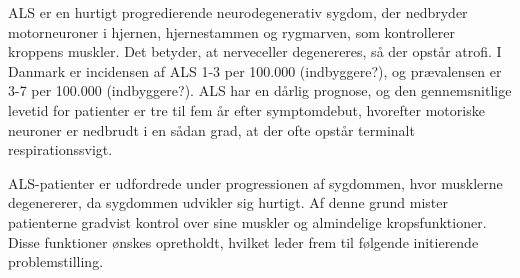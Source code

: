 ALS er en hurtigt progredierende neurodegenerativ sygdom, der nedbryder motorneuroner i hjernen, hjernestammen og rygmarven, som kontrollerer kroppens muskler. Det betyder, at nerveceller degenereres, så der opstår atrofi. I Danmark er incidensen af ALS 1-3 per 100.000 (indbyggere?), og prævalensen er 3-7 per 100.000 (indbyggere?). ALS har en dårlig prognose, og den gennemsnitlige levetid for patienter er tre til fem år efter symptomdebut, hvorefter motoriske neuroner er nedbrudt i en sådan grad, at der ofte opstår terminalt respirationssvigt. \citep{russell2015, morris2015}

ALS-patienter er udfordrede under progressionen af sygdommen, hvor musklerne degenererer, da sygdommen udvikler sig hurtigt. Af denne grund mister patienterne gradvist kontrol over sine muskler og almindelige kropsfunktioner. Disse funktioner ønskes opretholdt, hvilket leder frem til følgende initierende problemstilling. 
 

